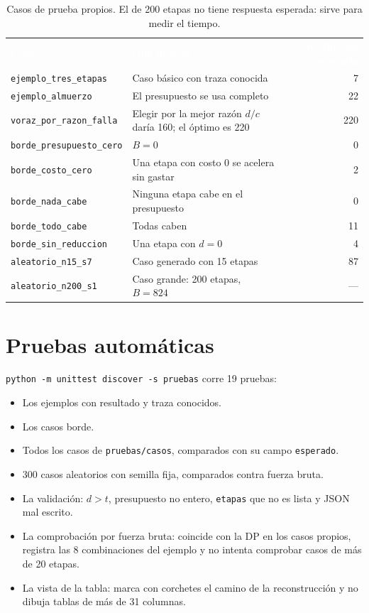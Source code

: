 \documentclass[11pt,a4paper]{article}
\newcommand{\cod}[1]{\texttt{#1}}
\newcommand{\encabezado}{\rowcolor{fondo}}
\newcommand{\blanco}[1]{\textcolor{white}{\textbf{#1}}}
\begin{document}
\begin{table}[H]
\centering\small
\renewcommand{\arraystretch}{1.2}
\begin{tabularx}{\textwidth}{@{}lXr@{}}
\encabezado \blanco{Caso} & \blanco{Qué prueba} & \blanco{Reducción esperada} \\
\cod{ejemplo\_tres\_etapas} & Caso básico con traza conocida & 7 \\
\cod{ejemplo\_almuerzo} & El presupuesto se usa completo & 22 \\
\cod{voraz\_por\_razon\_falla} & Elegir por la mejor razón $d/c$ daría 160; el óptimo es 220 & 220 \\
\cod{borde\_presupuesto\_cero} & $B=0$ & 0 \\
\cod{borde\_costo\_cero} & Una etapa con costo 0 se acelera sin gastar & 2 \\
\cod{borde\_nada\_cabe} & Ninguna etapa cabe en el presupuesto & 0 \\
\cod{borde\_todo\_cabe} & Todas caben & 11 \\
\cod{borde\_sin\_reduccion} & Una etapa con $d=0$ & 4 \\
\cod{aleatorio\_n15\_s7} & Caso generado con 15 etapas & 87 \\
\cod{aleatorio\_n200\_s1} & Caso grande: 200 etapas, $B=824$ & --- \\
\bottomrule
\end{tabularx}
\caption{Casos de prueba propios. El de 200 etapas no tiene respuesta esperada: sirve para medir el tiempo.}
\end{table}

\section{Pruebas automáticas}
\label{sec:pruebas}

\cod{python -m unittest discover -s pruebas} corre 19 pruebas:
\begin{itemize}
  \item Los ejemplos con resultado y traza conocidos.
  \item Los casos borde.
  \item Todos los casos de \cod{pruebas/casos}, comparados con su campo \cod{esperado}.
  \item 300 casos aleatorios con semilla fija, comparados contra fuerza bruta.
  \item La validación: $d>t$, presupuesto no entero, \cod{etapas} que no es lista y JSON mal escrito.
  \item La comprobación por fuerza bruta: coincide con la DP en los casos propios, registra las 8 combinaciones del ejemplo y no intenta comprobar casos de más de 20 etapas.
  \item La vista de la tabla: marca con corchetes el camino de la reconstrucción y no dibuja tablas de más de 31 columnas.
\end{itemize}
\end{document}
